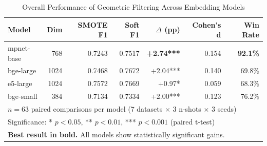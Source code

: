 

\begin{table}[htbp]
\centering
\caption{Overall Performance of Geometric Filtering Across Embedding Models}
\label{tab:embedding_overall}
\begin{tabular}{lrrrrrr}
\toprule
\textbf{Model} & \textbf{Dim} & \textbf{SMOTE F1} & \textbf{Soft F1} & \textbf{$\Delta$ (pp)} & \textbf{Cohen's d} & \textbf{Win Rate} \\
\midrule
mpnet-base     & 768  & 0.7243 & 0.7517 & \textbf{+2.74***} & 0.154 & \textbf{92.1\%} \\
bge-large      & 1024 & 0.7468 & 0.7672 & +2.04***          & 0.140 & 69.8\%          \\
e5-large       & 1024 & 0.7572 & 0.7669 & +0.97*            & 0.059 & 68.3\%          \\
bge-small      & 384  & 0.7134 & 0.7334 & +2.00***          & 0.123 & 76.2\%          \\
\midrule
\multicolumn{7}{l}{\small $n=63$ paired comparisons per model (7 datasets $\times$ 3 n-shots $\times$ 3 seeds)} \\
\multicolumn{7}{l}{\small Significance: * $p<0.05$, ** $p<0.01$, *** $p<0.001$ (paired t-test)} \\
\multicolumn{7}{l}{\small \textbf{Best result in bold.} All models show statistically significant gains.} \\
\bottomrule
\end{tabular}
\end{table}


